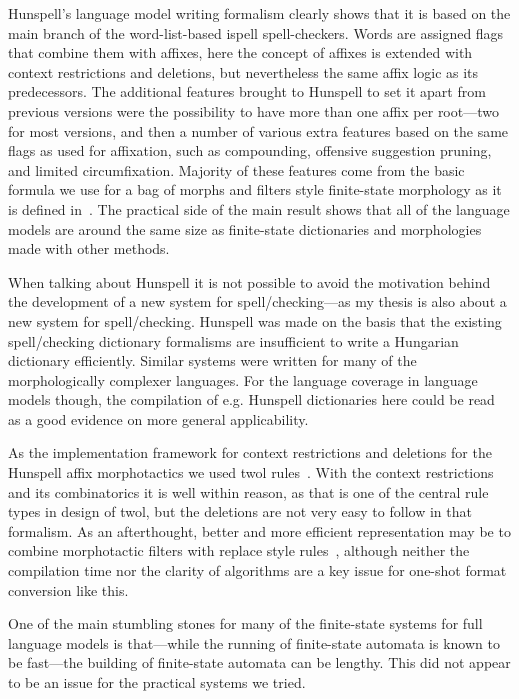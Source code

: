 \documentclass[officiallayout]{unihelcompling}
\begin{document}
Hunspell's language model writing formalism clearly shows that it is based on
the main branch of the word-list-based ispell spell-checkers. Words are
assigned flags that combine them with affixes, here the concept of affixes is
extended with context restrictions and deletions, but nevertheless the same
affix logic as its predecessors. The additional features brought to Hunspell to
set it apart from previous versions were the possibility to have more than one
affix per root---two for most versions, and then a number of various extra
features based on the same flags as used for affixation, such as compounding,
offensive suggestion pruning, and limited circumfixation.  Majority of these
features come from the basic formula we use for a bag of morphs and filters
style finite-state morphology as it is defined in~\citet{linden2009hfst}. The
practical side of the main result shows that all of the language models are
around the same size as finite-state dictionaries and morphologies made with
other methods.

When talking about Hunspell it is not possible to avoid the motivation behind
the development of a new system for spell\-/checking---as my thesis is also about
a new system for spell\-/checking. Hunspell was made on the basis that the
existing spell\-/checking dictionary formalisms are insufficient to write a
Hungarian dictionary efficiently. Similar systems were written for many of the
morphologically complexer languages. For the language coverage in language
models though, the compilation of e.g. Hunspell dictionaries here could be
read as a good evidence on more general applicability.

As the implementation framework for context restrictions and deletions for the
Hunspell affix morphotactics we used twol rules~\citep{karttunen1992two}. With
the context restrictions and its combinatorics it is well within reason, as
that is one of the central rule types in design of twol, but the deletions are
not very easy to follow in that formalism. As an afterthought, better and more
efficient representation may be to combine morphotactic filters with replace
style rules~\citep{karttunen1995replace}, although neither the compilation time
nor the clarity of algorithms are a key issue for one-shot format conversion
like this.

One of the main stumbling stones for many of the finite-state systems for full
language models is that---while the running of finite-state automata is known
to be fast---the building of finite-state automata can be lengthy. This did
not appear to be an issue for the practical systems we tried.
\end{document}
